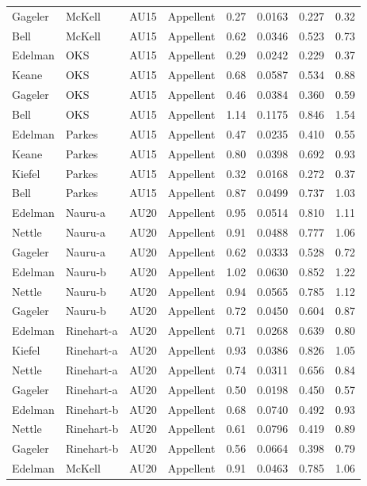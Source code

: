 \documentclass{monashthesis}
\begin{document}
\begin{center}
\begin{longtable}{llllllll}
Gageler & McKell & AU15 & Appellent & 0.27 & 0.0163 & 0.227 & 0.32 \\
Bell & McKell & AU15 & Appellent & 0.62 & 0.0346 & 0.523 & 0.73 \\
Edelman & OKS & AU15 & Appellent & 0.29 & 0.0242 & 0.229 & 0.37 \\
Keane & OKS & AU15 & Appellent & 0.68 & 0.0587 & 0.534 & 0.88 \\
Gageler & OKS & AU15 & Appellent & 0.46 & 0.0384 & 0.360 & 0.59 \\
Bell & OKS & AU15 & Appellent & 1.14 & 0.1175 & 0.846 & 1.54 \\
Edelman & Parkes & AU15 & Appellent & 0.47 & 0.0235 & 0.410 & 0.55 \\
Keane & Parkes & AU15 & Appellent & 0.80 & 0.0398 & 0.692 & 0.93 \\
Kiefel & Parkes & AU15 & Appellent & 0.32 & 0.0168 & 0.272 & 0.37 \\
Bell & Parkes & AU15 & Appellent & 0.87 & 0.0499 & 0.737 & 1.03 \\
Edelman & Nauru-a & AU20 & Appellent & 0.95 & 0.0514 & 0.810 & 1.11 \\
Nettle & Nauru-a & AU20 & Appellent & 0.91 & 0.0488 & 0.777 & 1.06 \\
Gageler & Nauru-a & AU20 & Appellent & 0.62 & 0.0333 & 0.528 & 0.72 \\
Edelman & Nauru-b & AU20 & Appellent & 1.02 & 0.0630 & 0.852 & 1.22 \\
Nettle & Nauru-b & AU20 & Appellent & 0.94 & 0.0565 & 0.785 & 1.12 \\
Gageler & Nauru-b & AU20 & Appellent & 0.72 & 0.0450 & 0.604 & 0.87 \\
Edelman & Rinehart-a & AU20 & Appellent & 0.71 & 0.0268 & 0.639 & 0.80 \\
Kiefel & Rinehart-a & AU20 & Appellent & 0.93 & 0.0386 & 0.826 & 1.05 \\
Nettle & Rinehart-a & AU20 & Appellent & 0.74 & 0.0311 & 0.656 & 0.84 \\
Gageler & Rinehart-a & AU20 & Appellent & 0.50 & 0.0198 & 0.450 & 0.57 \\
Edelman & Rinehart-b & AU20 & Appellent & 0.68 & 0.0740 & 0.492 & 0.93 \\
Nettle & Rinehart-b & AU20 & Appellent & 0.61 & 0.0796 & 0.419 & 0.89 \\
Gageler & Rinehart-b & AU20 & Appellent & 0.56 & 0.0664 & 0.398 & 0.79 \\
Edelman & McKell & AU20 & Appellent & 0.91 & 0.0463 & 0.785 & 1.06 \\

\end{longtable}
\end{center}
\end{document}
